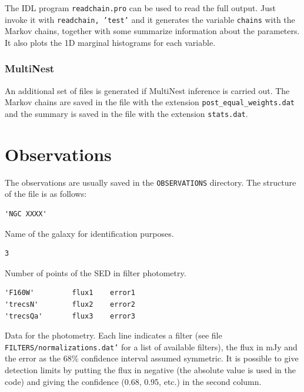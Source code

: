 \documentclass[12pt]{article}
\begin{document}
The IDL program \texttt{readchain.pro} can be used to read the full output. Just invoke it
with \texttt{readchain, 'test'} and it generates the variable \texttt{chains} with the Markov chains,
together with some summarize information about the parameters. It also plots the 1D marginal histograms
for each variable.

\subsubsection{MultiNest}
An additional set of files is generated if MultiNest inference is carried out. The Markov chains
are saved in the file with the extension \texttt{post\_equal\_weights.dat} and the summary
is saved in the file with the extension \texttt{stats.dat}.

\section{Observations}
\label{sec:observations}
The observations are usually saved in the \texttt{OBSERVATIONS} directory. The structure
of the file is as follows:

\begin{verbatim}
'NGC XXXX'
\end{verbatim}
Name of the galaxy for identification purposes.

\begin{verbatim}
3
\end{verbatim}
Number of points of the SED in filter photometry.

\begin{verbatim}
'F160W'         flux1    error1
'trecsN'        flux2    error2
'trecsQa'       flux3    error3
\end{verbatim}
Data for the photometry. Each line indicates a filter (see file \texttt{FILTERS/normalizations.dat'} for
a list of available filters), the flux in mJy and the error as the 68\% confidence interval
assumed symmetric. It is possible to give detection limits by putting the flux in negative (the
absolute value is used in the code) and giving the confidence (0.68, 0.95, etc.) in the second
column.


\end{document}
